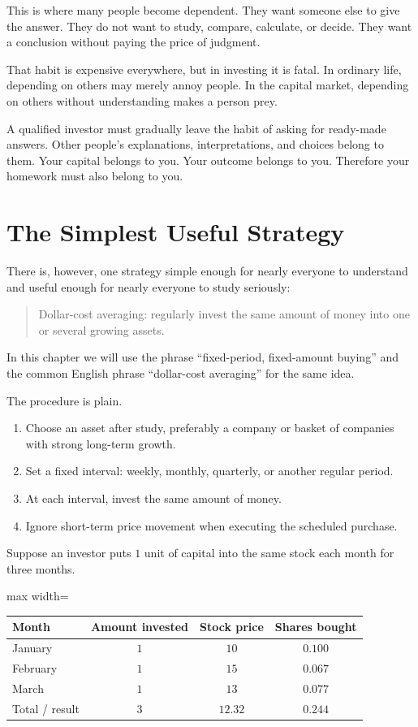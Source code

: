 This is where many people become dependent. They want someone else to give the answer. They do not want to study, compare, calculate, or decide. They want a conclusion without paying the price of judgment.

That habit is expensive everywhere, but in investing it is fatal. In ordinary life, depending on others may merely annoy people. In the capital market, depending on others without understanding makes a person prey.

A qualified investor must gradually leave the habit of asking for ready-made answers. Other people's explanations, interpretations, and choices belong to them. Your capital belongs to you. Your outcome belongs to you. Therefore your homework must also belong to you.

\section*{The Simplest Useful Strategy}

There is, however, one strategy simple enough for nearly everyone to understand and useful enough for nearly everyone to study seriously:

\begin{quote}
Dollar-cost averaging: regularly invest the same amount of money into one or several growing assets.
\end{quote}

In this chapter we will use the phrase ``fixed-period, fixed-amount buying'' and the common English phrase ``dollar-cost averaging'' for the same idea.

The procedure is plain.

\begin{enumerate}
\item Choose an asset after study, preferably a company or basket of companies with strong long-term growth.
\item Set a fixed interval: weekly, monthly, quarterly, or another regular period.
\item At each interval, invest the same amount of money.
\item Ignore short-term price movement when executing the scheduled purchase.
\end{enumerate}

Suppose an investor puts \(1\) unit of capital into the same stock each month for three months.

\begin{center}
\begin{adjustbox}{max width=\linewidth}
\begin{tabular}{lccc}
\hline
Month & Amount invested & Stock price & Shares bought \\
\hline
January & \(1\) & \(10\) & \(0.100\) \\
February & \(1\) & \(15\) & \(0.067\) \\
March & \(1\) & \(13\) & \(0.077\) \\
\hline
Total / result & \(3\) & \(12.32\) & \(0.244\) \\
\hline
\end{tabular}
\end{adjustbox}
\end{center}

